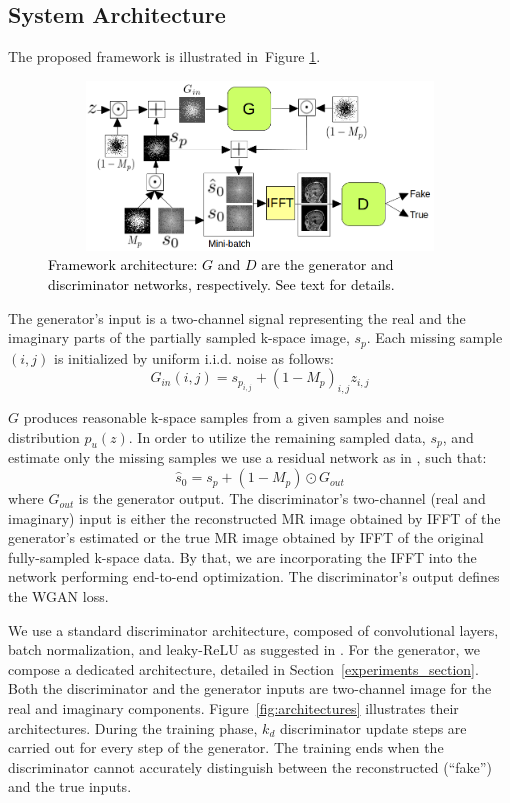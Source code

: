 \documentclass[review]{elsarticle}
\begin{document}
\subsection{System Architecture}
The proposed framework is illustrated in~Figure \ref{fig:system}.
\begin{figure}[H]
	\centering{}\includegraphics[width=12.0cm,height=4.5cm]{include/grp2/system_chart}\caption{\label{fig:system} \textcolor{black}{\footnotesize{}{}Framework
			architecture: $G$ and $D$ are the generator and discriminator networks,
			respectively. See text for details.}}
\end{figure}

The generator's input is a two-channel signal representing the real and the imaginary parts of the partially sampled k-space image, $s_{p}$. Each missing sample $\left(i,j\right)$ is initialized by uniform i.i.d. noise as follows: 
\begin{equation}
G_{in}\left(i,j\right)=s_{p_{i,j}}+\left(1-M_{p}\right)_{i,j}z_{i,j}
\end{equation}

$G$ produces reasonable k-space samples from a given samples and noise distribution $p_{u}\left(z\right)$. In order to utilize the remaining sampled data, $s_{p}$, and estimate only the missing samples we use a residual network \cite{he2016deep} as in \cite{Oktay2016}, such that:
\begin{equation}
\hat{s}_{0}=s_{p}+\left(1-M_{p}\right)\odot G_{out}
\end{equation}
where $G_{out}$ is the generator output. The discriminator's two-channel (real and imaginary) input is either the reconstructed MR image obtained by IFFT of the generator's estimated or the true MR image obtained by IFFT of the original fully-sampled k-space data. By that, we are incorporating the IFFT into the network performing end-to-end optimization. The discriminator's output defines the WGAN loss.

We use a standard discriminator architecture, composed of convolutional layers, batch normalization, and leaky-ReLU as suggested in \cite{radford2015unsupervised}. For the generator, we compose a dedicated architecture, detailed in Section~\ref{experiments_section}. Both the discriminator and the generator inputs are two-channel image for the real and imaginary components. Figure~\ref{fig:architectures} illustrates their architectures. During the training phase, $k_{d}$ discriminator update steps are carried out for every step of the generator. The training ends when the discriminator cannot accurately distinguish between the reconstructed (``fake'') and the true inputs.
\end{document}
